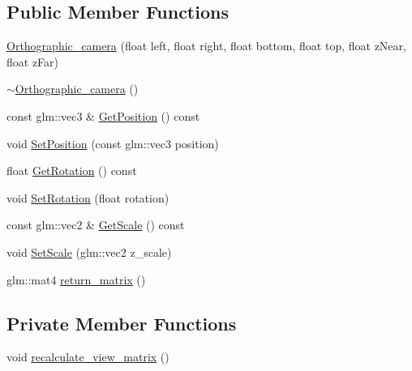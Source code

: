 \subsection*{Public Member Functions}
\begin{DoxyCompactItemize}
\item 
\hyperlink{classOrthographic__camera_aeb45b5f12a351769d0b80a2926193e7f}{Orthographic\+\_\+camera} (float left, float right, float bottom, float top, float z\+Near, float z\+Far)
\item 
\hyperlink{classOrthographic__camera_abd3ea1d0674fc8de61786ff787d97390}{$\sim$\+Orthographic\+\_\+camera} ()
\item 
const glm\+::vec3 \& \hyperlink{classOrthographic__camera_aae41cb7e5c48eb6ce5354d86c9d13123}{Get\+Position} () const
\item 
void \hyperlink{classOrthographic__camera_a3cf573e0cc2b494bf6ca7adf11df8d0f}{Set\+Position} (const glm\+::vec3 position)
\item 
float \hyperlink{classOrthographic__camera_a8c9169569698fca75d45550b0cf450b3}{Get\+Rotation} () const
\item 
void \hyperlink{classOrthographic__camera_aafb33c86e3b3178dd76192e72306f1fb}{Set\+Rotation} (float rotation)
\item 
const glm\+::vec2 \& \hyperlink{classOrthographic__camera_a6e6a3c646d9f677e2522671b0c0f1ce0}{Get\+Scale} () const
\item 
void \hyperlink{classOrthographic__camera_ac3975aafe2fc108abf27a9df0068dd56}{Set\+Scale} (glm\+::vec2 z\+\_\+scale)
\item 
glm\+::mat4 \hyperlink{classOrthographic__camera_ac8140eaa2011ecc0a7fb80ca38111909}{return\+\_\+matrix} ()
\end{DoxyCompactItemize}
\subsection*{Private Member Functions}
\begin{DoxyCompactItemize}
\item 
void \hyperlink{classOrthographic__camera_aa878ce1cd32947da29852ea03dcffd01}{recalculate\+\_\+view\+\_\+matrix} ()
\end{DoxyCompactItemize}
